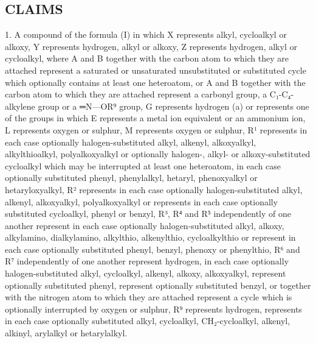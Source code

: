 \documentclass[11pt,a4paper]{article}
\begin{document}
\subsection{CLAIMS}

1. A compound of the formula (I) in which X represents alkyl, cycloalkyl or alkoxy, Y represents hydrogen, alkyl or alkoxy, Z represents hydrogen, alkyl or cycloalkyl, where A and B together with the carbon atom to which they are attached represent a saturated or unsaturated unsubstituted or substituted cycle which optionally contains at least one heteroatom, or A and B together with the carbon atom to which they are attached represent a carbonyl group, a C₁-C₄-alkylene group or a ═N—OR⁹ group, G represents hydrogen (a) or represents one of the groups in which E represents a metal ion equivalent or an ammonium ion, L represents oxygen or sulphur, M represents oxygen or sulphur, R¹ represents in each case optionally halogen-substituted alkyl, alkenyl, alkoxyalkyl, alkylthioalkyl, polyalkoxyalkyl or optionally halogen-, alkyl- or alkoxy-substituted cycloalkyl which may be interrupted at least one heteroatom, in each case optionally substituted phenyl, phenylalkyl, hetaryl, phenoxyalkyl or hetaryloxyalkyl, R² represents in each case optionally halogen-substituted alkyl, alkenyl, alkoxyalkyl, polyalkoxyalkyl or represents in each case optionally substituted cycloalkyl, phenyl or benzyl, R³, R⁴ and R⁵ independently of one another represent in each case optionally halogen-substituted alkyl, alkoxy, alkylamino, dialkylamino, alkylthio, alkenylthio, cycloalkylthio or represent in each case optionally substituted phenyl, benzyl, phenoxy or phenylthio, R⁶ and R⁷ independently of one another represent hydrogen, in each case optionally halogen-substituted alkyl, cycloalkyl, alkenyl, alkoxy, alkoxyalkyl, represent optionally substituted phenyl, represent optionally substituted benzyl, or together with the nitrogen atom to which they are attached represent a cycle which is optionally interrupted by oxygen or sulphur, R⁹ represents hydrogen, represents in each case optionally substituted alkyl, cycloalkyl, CH₂-cycloalkyl, alkenyl, alkinyl, arylalkyl or hetarylalkyl.
\end{document}
